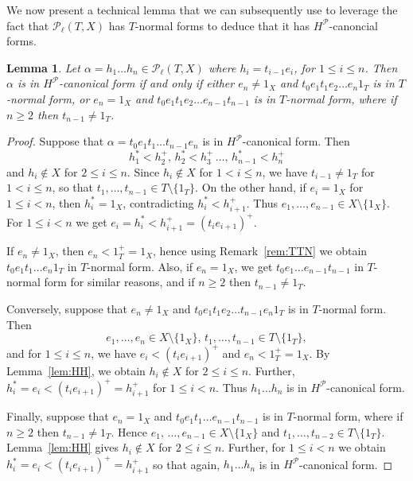 \documentclass[12pt]{amsart}
\newtheorem{lem}[them]{Lemma}
\theoremstyle{definition}
\theoremstyle{definition}
\numberwithin{them}{section}
\numberwithin{equation}{section}
\begin{document}
{{We now present a technical lemma that we can subsequently use to leverage  the fact that
$\mathcal{P}_{\ell}(T,X)$ has $T$-normal forms to  deduce that it has $H^{\mathcal{P}}$-canoncial forms.



\begin{lem}\label{T-normal vs T-Y notmal}
Let  $\alpha = h_1\dots h_n\in \mathcal{P}_{\ell}(T,X)$ where $h_i=t_{i-1}e_i$, for $ 1\leq i\leq n$. Then $\alpha$ is in $H^{\mathcal{P}}$-canonical form if and only if either $e_n\neq 1_X$ and $t_0e_1t_1e_2\dots e_n1_T$   is in $T$-normal form, or $e_n = 1_X$  and $t_0e_1t_1e_2\dots e_{n-1}t_{n-1}$ is in $T$-normal form, where if $n \geq 2$ then $t_{n-1} \neq 1_T$.
\end{lem}

\begin{proof}
Suppose that $\alpha= t_0e_1t_1 \dots t_{n-1}e_n$ is in 
$H^{\mathcal{P}}$-canonical form.  Then
\[h_1^*<h_2^+,\, h_2^*<h_3^+\,\dots,\, h_{n-1}^*<h_n^+\]
and $h_i\notin X$ for $2\leq i\leq n$. 
Since $h_i\notin X$ for $1<i\leq n$, we have $t_{i-1}\neq 1_T$ for $1< i\leq n$, so that $t_1,\dots, t_{n-1}\in T\setminus \{ 1_T\}$. On the other hand, if $e_i=1_X$ for $1\leq i<n$, then $h_i^*=1_X$, contradicting $h_i^*<h_{i+1}^+$.
Thus $e_1,\dots, e_{n-1}\in X\setminus\{ 1_X\}$. For $1\leq i<n$ we get $e_i=h_i^*<h_{i+1}^+=(t_ie_{i+1})^+$.

If $e_n\neq 1_X$, then $e_n<1_T^+=1_X$, hence using 
Remark~\ref{rem:TTN}
we obtain \, $t_0e_1t_1\dots e_n1_T$  in $T$-normal form. Also,  if $e_n=1_X$,  we get $t_0e_1\dots e_{n-1}t_{n-1}$ in $T$-normal form for similar reasons, and if $n\geq 2$ then $t_{n-1}\neq 1_T$.


Conversely, suppose that $e_n \neq 1_X$ and $t_0e_1t_1e_2\dots t_{n-1}e_n1_T$ is in $T$-normal form. Then
\[e_1, \dots, e_{n} \in X\setminus \{1_X\},\,   t_1, \dots, t_{n-1} \in T\setminus \{1_T\},\]
and for $1\leq i\leq n$, we have $e_i<(t_ie_{i+1})^+$
and $e_n<1_T^+=1_X$. 
 By Lemma~\ref{lem:HH}, we obtain $h_i\notin X$ for $2\leq i\leq n$. Further, $h_i^*=e_i<(t_ie_{i+1})^+=h_{i+1}^+$ for $1\leq i<n$. Thus
 $h_1\dots h_n$ is in $H^{\mathcal{P}}$-canonical form.

 Finally, suppose that $e_n=1_X$ and $t_0e_1t_1\dots e_{n-1}t_{n-1}$ is in $T$-normal form, where if $n\geq 2$ then $t_{n-1}\neq 1_T$. Hence $e_1,\,\dots, e_{n-1}\in X\setminus\{ 1_X\}$ and $t_1,\dots, t_{n-2}\in T\setminus \{ 1_T\}$. Lemma~\ref{lem:HH} gives  $h_i\notin X$ for $2\leq i\leq n$. Further, for
 $1\leq i<n$ we obtain  $h_i^*=e_i<(t_ie_{i+1})^+
 =h_{i+1}^+$ so that again, $h_1\dots h_n$ is in $H^{\mathcal{P}}$-canonical form. 
\end{proof}



}}
\end{document}
